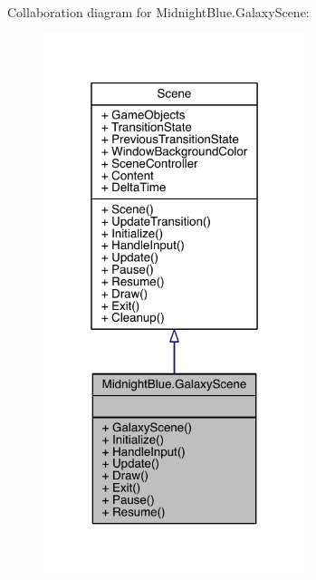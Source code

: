 Collaboration diagram for Midnight\+Blue.\+Galaxy\+Scene\+:
\nopagebreak
\begin{figure}[H]
\begin{center}
\leavevmode
\includegraphics[width=217pt]{class_midnight_blue_1_1_galaxy_scene__coll__graph}
\end{center}
\end{figure}

